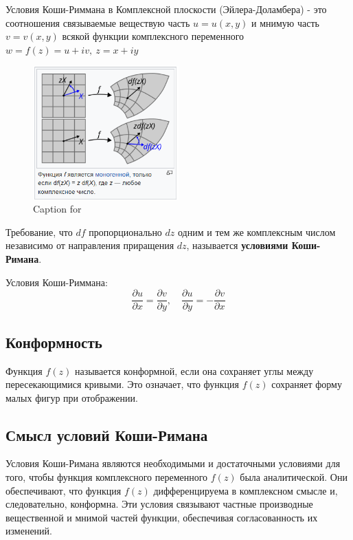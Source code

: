 \documentclass[a4paper,12pt]{article}
\begin{document}
Условия Коши-Риммана в Комплексной плоскости (Эйлера-Доламбера) - это соотношения 
связываемые веществую часть $u = u(x,y)$ и мнимую часть $v = v(x,y)$ всякой функции 
комплексного переменного $w = f(z) = u + iv, \ z = x + iy$

\begin{figure}[h]     
    \centering     
    \includegraphics[width=0.5\textwidth]{2025-02-24-20-41-56.png}     
    \caption{Caption for }     
    \label{} 
\end{figure}

Требование, что $df$ пропорционально $dz$ одним и тем же комплексным числом
 независимо от направления приращения $dz$, называется \textbf{условиями Коши-Римана}.

Условия Коши-Риммана:
\begin{equation*}
    \frac{\partial u}{\partial x} = \frac{\partial v}{\partial y}, \quad \frac{\partial 
    u}{\partial y} = -\frac{\partial v}{\partial x}
\end{equation*}

\subsection{Конформность}
Функция $f(z)$ называется конформной, если она сохраняет углы между пересекающимися 
кривыми. Это означает, что функция $f(z)$ сохраняет форму малых фигур при отображении.

\subsection{Смысл условий Коши-Римана}
Условия Коши-Римана являются необходимыми и достаточными условиями для того, чтобы 
функция комплексного переменного $f(z)$ была аналитической. Они обеспечивают, что 
функция $f(z)$ дифференцируема в комплексном смысле и, следовательно, конформна. Эти 
условия связывают частные производные вещественной и мнимой частей функции, обеспечивая 
согласованность их изменений.
\end{document}
